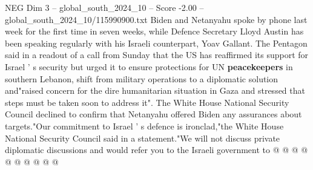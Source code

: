 \begin{textsample}{NEG Dim 3 – global\_south\_2024\_10 – Score -2.00 – global\_south\_2024\_10/115990900.txt}
Biden and Netanyahu spoke by phone last week for the first time in seven weeks, while Defence Secretary Lloyd Austin has been speaking regularly with his Israeli counterpart, Yoav Gallant.
The Pentagon said in a readout of a call from Sunday that the US has reaffirmed its support for Israel ' s security but urged it to ensure protections for UN \textbf{peacekeepers} in southern Lebanon, shift from military operations to a diplomatic solution and"raised concern for the dire humanitarian situation in Gaza and stressed that steps must be taken soon to address it".
The White House National Security Council declined to confirm that Netanyahu offered Biden any assurances about targets."Our commitment to Israel ' s defence is ironclad,"the White House National Security Council said in a statement."We will not discuss private diplomatic discussions and would refer you to the Israeli government to @ @ @ @ @ @ @ @ @ @

\end{textsample}
